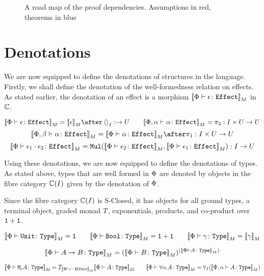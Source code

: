 \documentclass{Report}
\begin{document}
\begin{figure}[h!]
\begin{center}
{
    }
    \end{center}
\caption{A road map of the proof dependencies. Assumptions in red, theorems in blue}
\label{RoadMap}
\end{figure}


\section{Denotations}
We are now equipped to define the denotations of structures in the language. Firstly, we shall define the denotation of the well-formedness relation on effects. As stated earlier, the denotation of an effect is a morphism $\deno{\typerelation{\P}{\e}{\effect}}$ in $\C$.

\[
    \deno{\typerelation{\P}{e}{\effect}} = \deno{\e} \after \term{I}: \rightarrow U
    \quad\quad
    \deno{\typerelation{\P,\a}{\a}{\effect}} = \pp: I\times U \rightarrow U
\]\[
    \deno{\typerelation{\P, \b}{\a}{\effect}} = \deno{\typerelation{\P}{\a}{\effect}}\after\p: I\times U\rightarrow U
\]\[
    \deno{\typerelation{\P}{\e_1\dot \e_2}{\effect}} = \Mul(\deno{\typerelation{\P}{\e_2}{\effect}},\deno{\typerelation{\P}{\e_1}{\effect}}): I \rightarrow U
\]

Using these denotations, we are now equipped to define the denotations of types. As stated above, types that are well formed in $\P$ are denoted by objects in the fibre category $\C(I)$ given by the denotation of $\P$.

Since the fibre category $\C(I)$ is S-Closed, it has objects for all ground types, a terminal object, graded monad $\T{}{}$, exponentials, products, and co-product over $\1+\1$.

\[
    \deno{\typerelation{\P}{\U}{\type}} = \1
    \quad\quad
    \deno{\typerelation{\P}{\B}{\type}} = \1+\1
    \quad\quad
    \deno{\typerelation{\P}{\g}{\type}} = \deno{\g}
\] 

\[
    \deno{\typerelation{\P}{\ab}{\type}} = (\deno{\typerelation{\P}{B}{\type}})^{(\deno{\typerelation{\P}{A}{\type}})}
\]

\[
    \deno{\typerelation{\P}{\mea}{\type}} =\T{\deno{\typerelation{\P}{\e}{\effect}}}{\deno{\typerelation{\P}{A}{\type}}}
    \quad\quad
    \deno{\typerelation{\P}{\all{\a}{A}}{\type}} =\allI(\deno{\typerelation{\P,\a}{A}{\type}})
\]
\end{document}
